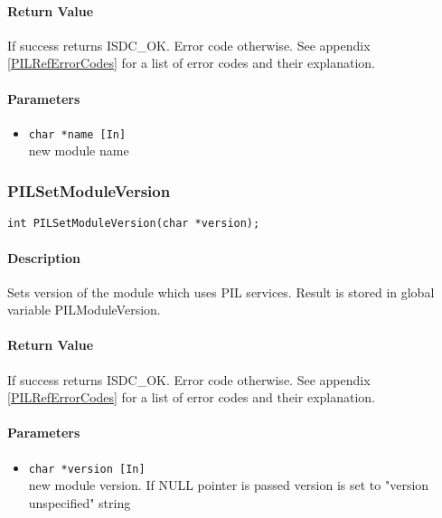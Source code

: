 \paragraph{Return Value\\}
If success returns ISDC\_OK. Error code otherwise. See appendix \ref{PILRefErrorCodes}
for a list of error codes and their explanation.

\paragraph{Parameters}
\begin{itemize}
\item
{\tt char *name [In] } \\
new module name
\end{itemize}



\subsubsection{PILSetModuleVersion}

\begin{verbatim}
int PILSetModuleVersion(char *version);
\end{verbatim}

\paragraph{Description\\}
Sets version of the module which uses PIL services. Result is stored in
global variable
PILModuleVersion.

\paragraph{Return Value\\}
If success returns ISDC\_OK. Error code otherwise. See appendix \ref{PILRefErrorCodes}
for a list of error codes and their explanation.

\paragraph{Parameters}
\begin{itemize}
\item
{\tt char *version [In] } \\
new module version. If NULL pointer is passed version is set to "version
unspecified" string
\end{itemize}


